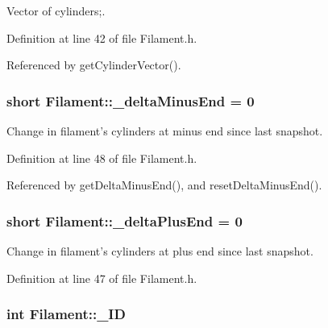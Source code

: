 Vector of cylinders;. 



Definition at line 42 of file Filament.\+h.



Referenced by get\+Cylinder\+Vector().

\hypertarget{classFilament_ac00eb37c21190ce574738d7f5259cf58}{
\subsubsection[{\+\_\+delta\+Minus\+End}]{\setlength{\rightskip}{0pt plus 5cm}short Filament\+::\+\_\+delta\+Minus\+End = 0\hspace{0.3cm}{\ttfamily [private]}}}\label{classFilament_ac00eb37c21190ce574738d7f5259cf58}


Change in filament's cylinders at minus end since last snapshot. 



Definition at line 48 of file Filament.\+h.



Referenced by get\+Delta\+Minus\+End(), and reset\+Delta\+Minus\+End().

\hypertarget{classFilament_ab22323b878792e2c309417f9b8435c97}{
\subsubsection[{\+\_\+delta\+Plus\+End}]{\setlength{\rightskip}{0pt plus 5cm}short Filament\+::\+\_\+delta\+Plus\+End = 0\hspace{0.3cm}{\ttfamily [private]}}}\label{classFilament_ab22323b878792e2c309417f9b8435c97}


Change in filament's cylinders at plus end since last snapshot. 



Definition at line 47 of file Filament.\+h.

\hypertarget{classFilament_a15071125666bbd624b9b290969872bdb}{
\subsubsection[{\+\_\+\+I\+D}]{\setlength{\rightskip}{0pt plus 5cm}int Filament\+::\+\_\+\+I\+D\hspace{0.3cm}{\ttfamily [private]}}}\label{classFilament_a15071125666bbd624b9b290969872bdb}


